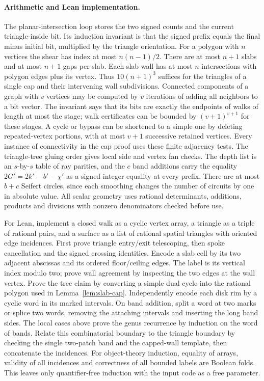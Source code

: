 \paragraph{Arithmetic and Lean implementation.}
The planar-intersection loop stores the two signed counts and the current
triangle-inside bit. Its induction invariant is that the signed prefix
equals the final minus initial bit, multiplied by the triangle orientation.
For a polygon with $n$ vertices the shear has index at most $n(n-1)/2$.
There are at most $n+1$ slabs and at most $n+1$ gaps per slab.
Each slab wall has at most $n$ intersections with polygon edges plus
its vertex. Thus $10(n+1)^3$ suffices for the triangles of a single cap
and their intervening wall subdivisions. Connected components of a graph
with $v$ vertices may be computed by $v$ iterations of adding all
neighbors to a bit vector. The invariant says that its bits are exactly
the endpoints of walks of length at most the stage; walk certificates can
be bounded by $(v+1)^{v+1}$ for these stages. A cycle or bypass can be
shortened to a simple one by deleting repeated-vertex portions, with at
most $v+1$ successive retained vertices. Every instance of connectivity
in the cap proof uses these finite adjacency tests. The triangle-tree
gluing order gives local side and vertex fan checks. The depth list is
an $s$-by-$s$ table of ray parities, and the $c$ band additions carry
the equality $2G'=2k'-b'-\chi'$ as a signed-integer equality at every
prefix. There are at most $b+c$ Seifert circles, since each smoothing
changes the number of circuits by one in absolute value. All scalar
geometry uses rational determinants, additions, products and divisions
with nonzero denominators checked before use.

For Lean, implement a closed walk as a cyclic vertex array, a triangle
as a triple of rational pairs, and a surface as a list of rational
spatial triangles with oriented edge incidences. First prove triangle
entry/exit telescoping, then spoke cancellation and the signed crossing
identities. Encode a slab cell by its two adjacent abscissas and its
ordered floor/ceiling edges. The label is its vertical index modulo two;
prove wall agreement by inspecting the two edges at the wall vertex.
Prove the tree claim by converting a simple dual cycle into the rational
polygon used in Lemma~\ref{lem:slab-cap}. Independently encode each
disk rim by a cyclic word in its marked intervals. On band addition,
split a word at two marks or splice two words, removing the attaching
intervals and inserting the long band sides. The local cases above
prove the genus recurrence by induction on the word of bands.
Relate this combinatorial boundary to the triangle boundary by checking
the single two-patch band and the capped-wall template, then concatenate
the incidences. For object-theory induction, equality of arrays,
validity of all incidences and correctness of all bounded labels are
Boolean folds. This leaves only quantifier-free induction with the
input code as a free parameter.
